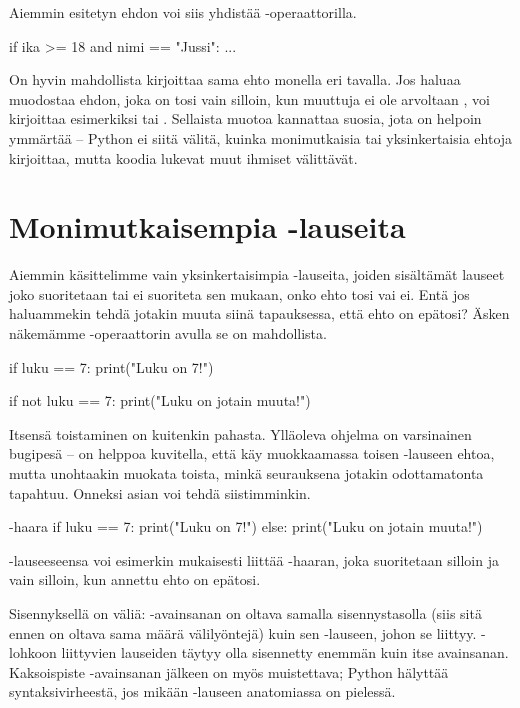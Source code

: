 Aiemmin esitetyn ehdon voi siis yhdistää -operaattorilla.

\begin{python}
if ika >= 18 and nimi == "Jussi":
	...
\end{python}

On hyvin mahdollista kirjoittaa sama ehto monella eri tavalla. Jos haluaa muodostaa ehdon, joka on tosi vain silloin, kun muuttuja  ei ole arvoltaan , voi kirjoittaa esimerkiksi  tai . Sellaista muotoa kannattaa suosia, jota on helpoin ymmärtää – Python ei siitä välitä, kuinka monimutkaisia tai yksinkertaisia ehtoja kirjoittaa, mutta koodia lukevat muut ihmiset välittävät.

\section{Monimutkaisempia -lauseita}

Aiemmin käsittelimme vain yksinkertaisimpia -lauseita, joiden sisältämät lauseet joko suoritetaan tai ei suoriteta sen mukaan, onko ehto tosi vai ei. Entä jos haluammekin tehdä jotakin muuta siinä tapauksessa, että ehto on epätosi? Äsken näkemämme -operaattorin avulla se on mahdollista.

\begin{python}
if luku == 7:
	print("Luku on 7!")

if not luku == 7:
	print("Luku on jotain muuta!")
\end{python}

Itsensä toistaminen on kuitenkin pahasta. Ylläoleva ohjelma on varsinainen bugipesä – on helppoa kuvitella, että käy muokkaamassa toisen -lauseen ehtoa, mutta unohtaakin muokata toista, minkä seurauksena jotakin odottamatonta tapahtuu. Onneksi asian voi tehdä siistimminkin.

\begin{example}{-haara}
if luku == 7:
	print("Luku on 7!")
else:
	print("Luku on jotain muuta!")
\end{example}

-lauseeseensa voi esimerkin mukaisesti liittää -haaran, joka suoritetaan silloin ja vain silloin, kun annettu ehto on epätosi.

Sisennyksellä on väliä: -avainsanan on oltava samalla sisennystasolla (siis sitä ennen on oltava sama määrä välilyöntejä) kuin sen -lauseen, johon se liittyy. -lohkoon liittyvien lauseiden täytyy olla sisennetty enemmän kuin itse avainsanan. Kaksoispiste -avainsanan jälkeen on myös muistettava; Python hälyttää syntaksivirheestä, jos mikään -lauseen anatomiassa on pielessä.

